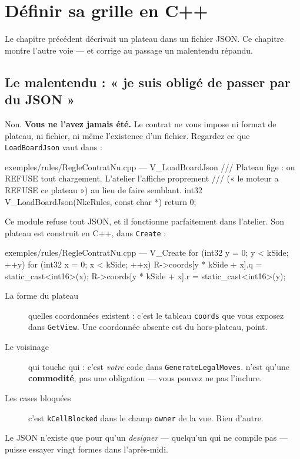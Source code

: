 \chapter{Définir sa grille en C++}

Le chapitre précédent décrivait un plateau dans un fichier JSON. Ce chapitre
montre l'autre voie — et corrige au passage un malentendu répandu.

\section{Le malentendu : « je suis obligé de passer par du JSON »}

Non. \textbf{Vous ne l'avez jamais été.} Le contrat ne vous impose ni format de
plateau, ni fichier, ni même l'existence d'un fichier. Regardez ce que
\texttt{LoadBoardJson} vaut dans  :

\begin{nkcode}{exemples/rules/RegleContratNu.cpp — V\_LoadBoardJson}
/// Plateau fige : on REFUSE tout chargement. L'atelier l'affiche proprement
/// (« le moteur a REFUSE ce plateau ») au lieu de faire semblant.
int32 V_LoadBoardJson(NkcRules, const char *) { return 0; }
\end{nkcode}

Ce module refuse tout JSON, et il fonctionne parfaitement dans l'atelier. Son
plateau est construit en C++, dans \texttt{Create} :

\begin{nkcode}{exemples/rules/RegleContratNu.cpp — V\_Create}
for (int32 y = 0; y < kSide; ++y)
    for (int32 x = 0; x < kSide; ++x) {
        R->coords[y * kSide + x].q = static_cast<int16>(x);
        R->coords[y * kSide + x].r = static_cast<int16>(y);
    }
\end{nkcode}

\begin{nkretenir}
\begin{description}
  \item[La forme du plateau] quelles coordonnées existent : c'est le tableau
        \texttt{coords} que vous exposez dans \texttt{GetView}. Une coordonnée
        absente est du hors-plateau, point.
  \item[Le voisinage] qui touche qui : c'est \emph{votre} code dans
        \texttt{GenerateLegalMoves}.  n'est qu'une
        \textbf{commodité}, pas une obligation — vous pouvez ne pas l'inclure.
  \item[Les cases bloquées] c'est \texttt{kCellBlocked} dans le champ
        \texttt{owner} de la vue. Rien d'autre.
\end{description}
Le JSON n'existe que pour qu'un \emph{designer} — quelqu'un qui ne compile pas —
puisse essayer vingt formes dans l'après-midi.
\end{nkretenir}

